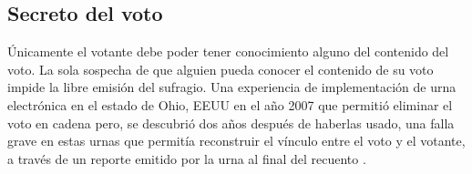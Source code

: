 \subsection{Secreto del voto}
Únicamente el votante debe poder tener conocimiento alguno del contenido del voto. La sola sospecha de que alguien pueda conocer el contenido de su voto impide la libre emisión del sufragio.
Una experiencia de implementación de urna electrónica en el estado de Ohio, EEUU en el año 2007 que permitió eliminar el voto en cadena pero, se descubrió dos años después de haberlas usado, una falla grave en estas urnas que permitía reconstruir el vínculo entre el voto y el votante, a través de un reporte emitido por la urna al final del recuento \cite{mcdaniel2007everest}.

